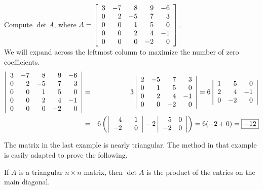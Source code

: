 \begin{Exam} Compute $\det A$, where $A = \mtx{rrrrr}{3&-7&8&9&-6\\0&2&-5&7&3\\0&0&1&5&0\\0&0&2&4&-1\\0&0&0&-2&0}$.\\

We will expand across the leftmost column to maximize the number of zero coefficients.
\begin{eqnarray*}
\dtx{rrrrr}{3&-7&8&9&-6\\0&2&-5&7&3\\0&0&1&5&0\\0&0&2&4&-1\\0&0&0&-2&0} &=& 3\dtx{rrrr}{2&-5&7&3\\0&1&5&0\\0&2&4&-1\\0&0&-2&0} = 6\dtx{rrr}{1&5&0\\2&4&-1\\0&-2&0}\\
&=& 6\left(\dtx{rr}{4&-1\\-2&0} - 2\dtx{rrrr}{5&0\\-2&0}\right)=6(-2+0) = \fbox{$-12$}
\end{eqnarray*}
\end{Exam}

The matrix in the last example is nearly triangular. The method in that example is easily adapted to prove the following.\\

\begin{Thm} If $A$ is a triangular $n\times n$ matrix, then $\det A$ is the product of the entries on the main diagonal.
\end{Thm}

